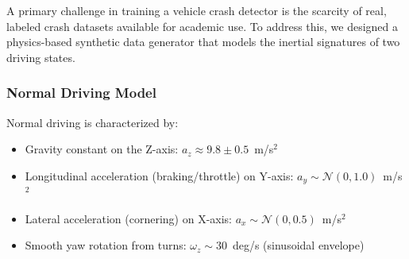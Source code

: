 \documentclass[journal]{IEEEtran}
\begin{document}
A primary challenge in training a vehicle crash detector is the scarcity of
real, labeled crash datasets available for academic use. To address this, we
designed a physics-based synthetic data generator that models the inertial
signatures of two driving states.

\subsubsection{Normal Driving Model}
Normal driving is characterized by:
\begin{itemize}
  \item Gravity constant on the Z-axis: $a_z \approx 9.8 \pm 0.5$~m/s$^2$
  \item Longitudinal acceleration (braking/throttle) on Y-axis: $a_y \sim \mathcal{N}(0, 1.0)$~m/s$^2$
  \item Lateral acceleration (cornering) on X-axis: $a_x \sim \mathcal{N}(0, 0.5)$~m/s$^2$
  \item Smooth yaw rotation from turns: $\omega_z \sim 30$~deg/s (sinusoidal envelope)
\end{itemize}
\end{document}
